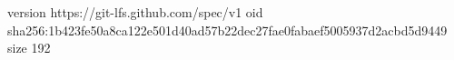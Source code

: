 version https://git-lfs.github.com/spec/v1
oid sha256:1b423fe50a8ca122e501d40ad57b22dec27fae0fabaef5005937d2acbd5d9449
size 192
